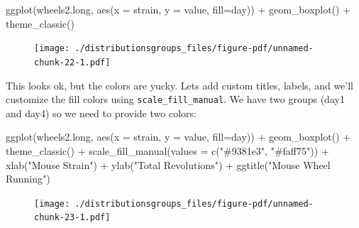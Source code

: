 \documentclass[
  letterpaper,
  DIV=11,
  numbers=noendperiod]{scrreprt}
\newenvironment{Shaded}{\begin{snugshade}}{\end{snugshade}}
\newcommand{\AttributeTok}[1]{\textcolor[rgb]{0.40,0.45,0.13}{#1}}
\newcommand{\FunctionTok}[1]{\textcolor[rgb]{0.28,0.35,0.67}{#1}}
\newcommand{\NormalTok}[1]{\textcolor[rgb]{0.00,0.23,0.31}{#1}}
\newcommand{\SpecialCharTok}[1]{\textcolor[rgb]{0.37,0.37,0.37}{#1}}
\newcommand{\StringTok}[1]{\textcolor[rgb]{0.13,0.47,0.30}{#1}}
\begin{document}
\begin{Shaded}
\begin{Highlighting}[]
\FunctionTok{ggplot}\NormalTok{(wheels2.long, }\FunctionTok{aes}\NormalTok{(}\AttributeTok{x =}\NormalTok{ strain, }\AttributeTok{y =}\NormalTok{ value, }\AttributeTok{fill=}\NormalTok{day)) }\SpecialCharTok{+} 
  \FunctionTok{geom\_boxplot}\NormalTok{() }\SpecialCharTok{+}
  \FunctionTok{theme\_classic}\NormalTok{()}
\end{Highlighting}
\end{Shaded}

\begin{figure}[H]

{\centering \texttt{[image: ./distributionsgroups\_files/figure-pdf/unnamed-chunk-22-1.pdf]}

}

\end{figure}

This looks ok, but the colors are yucky. Lets add custom titles, labels,
and we'll customize the fill colors using \texttt{scale\_fill\_manual}.
We have two groups (day1 and day4) so we need to provide two colors:

\begin{Shaded}
\begin{Highlighting}[]
\FunctionTok{ggplot}\NormalTok{(wheels2.long, }\FunctionTok{aes}\NormalTok{(}\AttributeTok{x =}\NormalTok{ strain, }\AttributeTok{y =}\NormalTok{ value, }\AttributeTok{fill=}\NormalTok{day)) }\SpecialCharTok{+} 
  \FunctionTok{geom\_boxplot}\NormalTok{() }\SpecialCharTok{+}
  \FunctionTok{theme\_classic}\NormalTok{() }\SpecialCharTok{+}
  \FunctionTok{scale\_fill\_manual}\NormalTok{(}\AttributeTok{values =} \FunctionTok{c}\NormalTok{(}\StringTok{"\#9381e3"}\NormalTok{, }\StringTok{"\#faff75"}\NormalTok{)) }\SpecialCharTok{+}
  \FunctionTok{xlab}\NormalTok{(}\StringTok{"Mouse Strain"}\NormalTok{) }\SpecialCharTok{+}
  \FunctionTok{ylab}\NormalTok{(}\StringTok{"Total Revolutions"}\NormalTok{) }\SpecialCharTok{+}
  \FunctionTok{ggtitle}\NormalTok{(}\StringTok{"Mouse Wheel Running"}\NormalTok{) }
\end{Highlighting}
\end{Shaded}

\begin{figure}[H]

{\centering \texttt{[image: ./distributionsgroups\_files/figure-pdf/unnamed-chunk-23-1.pdf]}

}

\end{figure}
\end{document}
